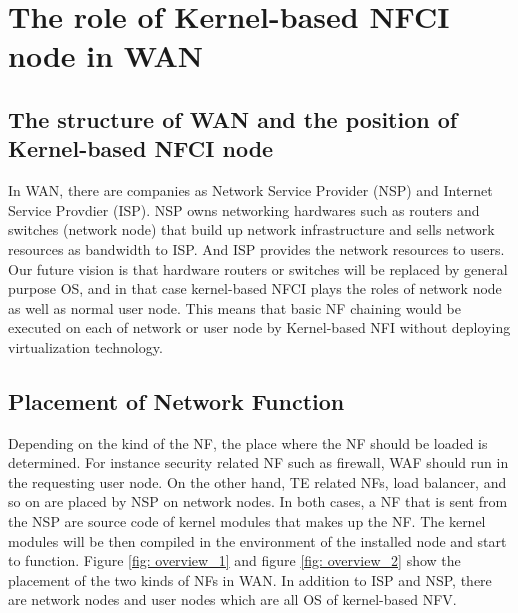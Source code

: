 \section{The role of Kernel-based NFCI node in WAN}
\subsection{The structure of WAN and the position of Kernel-based NFCI node}
In WAN, there are companies as Network Service Provider (NSP) and Internet Service Provdier (ISP). NSP owns networking hardwares such as routers and switches (network node) that build up network infrastructure and sells network resources as bandwidth to ISP. And ISP provides the network resources to users. Our future vision is that hardware routers or switches will be replaced by general purpose OS, and in that case kernel-based NFCI plays the roles of network node as well as normal user node. This means that basic NF chaining would be executed on each of network or user node by Kernel-based NFI without deploying virtualization technology. 

\subsection{Placement of Network Function}
Depending on the kind of the NF, the place where the NF should be loaded is determined. For instance security related NF such as firewall, WAF should run in the requesting user node. On the other hand, TE related NFs, load balancer, and so on are placed by NSP on network nodes. In both cases, a NF that is sent from the NSP are source code of kernel modules that makes up the NF. The kernel modules will be then compiled in the environment of the installed node and start to function. 
Figure \ref{fig: overview_1} and figure \ref{fig: overview_2} show the placement of the two kinds of NFs in WAN. In addition to ISP and NSP, there are network nodes and user nodes which are all OS of kernel-based NFV. 

